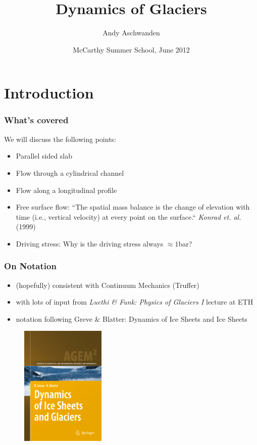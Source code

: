 \documentclass[hide notes,intlimits]{beamer}
\title[Glacier Dynamics] %
{Dynamics of Glaciers}
\author[Aschwanden] %
{Andy Aschwanden}
\institute[ARSC] %
{
  Arctic Region Supercomputing Center\\
  University of Alaska Fairbanks, USA
}
\date{McCarthy Summer School, June 2012}
\begin{document}


\begin{frame}
  \titlepage
\end{frame}



\section{Introduction}
\label{sec:introduction}

\begin{frame}
  \frametitle{What's covered}
  We will discuss the following points:
  \begin{itemize}
  \item Parallel sided slab
  \item Flow through a cylindrical channel
  \item Flow along a longitudinal profile
  \item Free surface flow: ``The spatial mass balance is the change of elevation with time (i.e., vertical velocity) at every point on the surface.`` \emph{Konrad et. al.} (1999)
  \item Driving stress: Why is the driving stress always $\approx 1$bar?
 \end{itemize}
\end{frame}


\begin{frame}
  \frametitle{On Notation}
  \begin{itemize}
  \item (hopefully) consistent with Continuum Mechanics (Truffer)
  \item with lots of input from \emph{Luethi \& Funk: Physics of Glaciers I} lecture at ETH
  \item notation following Greve \& Blatter: Dynamics of Ice Sheets and Ice Sheets
  \end{itemize}
  \begin{figure}
    \includegraphics[scale=1.25]{figures/greveblatter_disg}
  \end{figure}
\end{frame}
\end{document}
